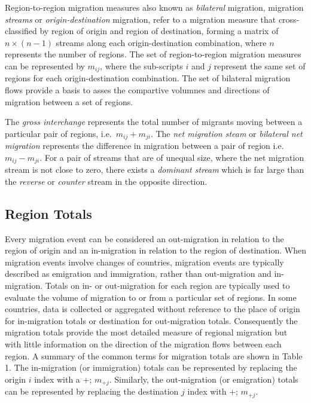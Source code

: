 \documentclass[
]{book}
\begin{document}
Region-to-region migration measures also known as \emph{bilateral} migration, migration \emph{streams} or \emph{origin-destination} migration, refer to a migration measure that cross-classified by region of origin and region of destination, forming a matrix of \(n \times (n-1)\) streams along each origin-destination combination, where \(n\) represents the number of regions. The set of region-to-region migration measures can be represented by \(m_{ij}\), where the sub-scripts \(i\) and \(j\) represent the same set of regions for each origin-destination combination. The set of bilateral migration flows provide a basis to asses the compartive volumnes and directions of migration between a set of regions.

The \emph{gross interchange} represents the total number of migrants moving between a particular pair of regions, i.e.~\(m_{ij} + m_{ji}\). The \emph{net migration steam} or \emph{bilateral net migration} represents the difference in migration between a pair of region i.e.~\(m_{ij} - m_{ji}\). For a pair of streams that are of unequal size, where the net migration stream is not close to zero, there exists a \emph{dominant stream} which is far large than the \emph{reverse} or \emph{counter} stream in the opposite direction.

\hypertarget{region-totals}{%
\subsection{Region Totals}\label{region-totals}}

Every migration event can be considered an out-migration in relation to the region of origin and an in-migration in relation to the region of destination. When migration events involve changes of countries, migration events are typically described as emigration and immigration, rather than out-migration and in-migration. Totals on in- or out-migration for each region are typically used to evaluate the volume of migration to or from a particular set of regions. In some countries, data is collected or aggregated without reference to the place of origin for in-migration totals or destination for out-migration totals. Consequently the migration totals provide the most detailed measure of regional migration but with little information on the direction of the migration flows between each region. A summary of the common terms for migration totals are shown in Table 1. The in-migration (or immigration) totals can be represented by replacing the origin \(i\) index with a \(+\); \(m_{+j}\). Similarly, the out-migration (or emigration) totals can be represented by replacing the destination \(j\) index with \(+\); \(m_{+j}\).
\end{document}
